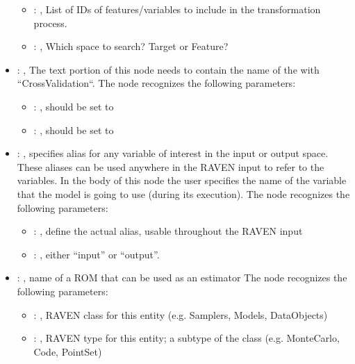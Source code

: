 \begin{itemize}
\begin{itemize}
        \item {}: , 
          List of IDs of features/variables to include in the transformation process.

        \item {}: , 
          Which space to search? Target or Feature?
      \end{itemize}

    \item {}: , 
      The text portion of this node needs to contain the name of the  with
               ``CrossValidation``.
      The  node recognizes the following parameters:
        \begin{itemize}
          \item {}: , 
            should be set to 
          \item {}: , 
            should be set to 
      \end{itemize}

    \item {}: , 
      specifies alias for         any variable of interest in the input or output space. These
      aliases can be used anywhere in the RAVEN input to         refer to the variables. In the body
      of this node the user specifies the name of the variable that the model is going to use
      (during its execution).
      The  node recognizes the following parameters:
        \begin{itemize}
          \item {}: , 
            define the actual alias, usable throughout the RAVEN input
          \item {}: , 
            either ``input'' or ``output''.
      \end{itemize}

    \item {}: , 
      name of a ROM that can be used as an estimator
      The  node recognizes the following parameters:
        \begin{itemize}
          \item {}: , 
            RAVEN class for this entity (e.g. Samplers, Models, DataObjects)
          \item {}: , 
            RAVEN type for this entity; a subtype of the class (e.g. MonteCarlo, Code, PointSet)
      \end{itemize}


\end{itemize}
